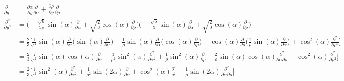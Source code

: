 \documentclass{article}
\begin{document}
\begin{subequations}
\begin{align*}
        \frac{\partial}{\partial y}        &= \frac{\partial\alpha}{\partial y} \frac{\partial}{\partial\alpha} +  \frac{\partial\rho}{\partial y} \frac{\partial}{\partial\rho} \\
        \frac{\partial^2}{\partial y^2}&= \Big( -\frac{\sqrt{6}}{3\rho} \sin(\alpha) \frac{\partial}{\partial\alpha} + \sqrt{\frac{2}{3}} \cos(\alpha) \frac{\partial}{\partial\rho}\Big)  \Big( -\frac{\sqrt{6}}{3}  \sin(\alpha) \frac{\partial}{\partial\alpha} + \sqrt{\frac{2}{3}} \cos(\alpha) \frac{\partial}{\partial\rho}\Big) \\
                                                    &= \frac{2}{3} \Big[ \frac{1}{\rho^2} \sin(\alpha) \frac{\partial}{\partial\alpha} \Big( \sin(\alpha) \frac{\partial}{\partial\alpha}\Big) - \frac{1}{\rho} \sin(\alpha) \frac{\partial}{\partial\alpha} \Big( \cos(\alpha) \frac{\partial}{\partial\rho} \Big) - \cos(\alpha) \frac{\partial}{\partial\rho} \Big( \frac{1}{\rho} \sin(\alpha) \frac{\partial}{\partial\alpha} \Big) + \cos^2(\alpha)\frac{\partial^2}{\partial\rho^{2}} \Big] \\
                                                    &= \frac{2}{3} \Big[ \frac{2}{\rho^2} \sin(\alpha) \cos(\alpha) \frac{\partial}{\partial\alpha} + \frac{1}{\rho^2} \sin^2(\alpha)\frac{\partial^2}{\partial\alpha^{2}} + \frac{1}{\rho} \sin^2(\alpha) \frac{\partial}{\partial\rho} - \frac{2}{\rho}\sin(\alpha)\cos(\alpha) \frac{\partial^2}{\partial\alpha \partial\rho} +\cos^2(\alpha)\frac{\partial^2}{\partial\rho^{2}}  \Big]\\
                                                    &= \frac{2}{3} \Big[ \frac{1}{\rho^2} \sin^2(\alpha)\frac{\partial^2}{\partial\alpha^{2}} + \frac{1}{\rho^2} \sin(2\alpha)\frac{\partial}{\partial\alpha} + \cos^2(\alpha) \frac{\partial^2}{\rho^2} - \frac{1}{\rho} \sin(2\alpha) \frac{\partial^2}{\partial\alpha \partial\rho} \Big]
\end{align*}
\end{subequations}
\end{document}
